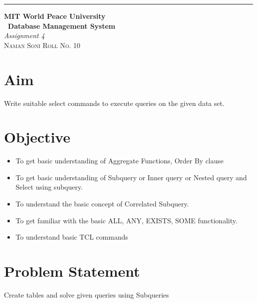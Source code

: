\documentclass{article}
\begin{document}
	\begin{titlepage} %
		
		\raggedleft\rule{1pt}{\textheight} %
		\hspace{0.05\textwidth} %
		\parbox[b]{0.75\textwidth}
		{ %
			
			{\Huge\bfseries MIT World Peace University \\[0.5\baselineskip] \ Database Management System}\\[2\baselineskip] %
			{\large\textit{Assignment 4}}\\[4\baselineskip] %
			{\Large\textsc{Naman Soni Roll No. 10}} %
			
			\vspace{0.5\textheight} %
		}
		
\end{titlepage}
\tableofcontents
\pagebreak
\section{\textbf{Aim}}
Write suitable select commands to execute queries on the given data set.
\section{\textbf{Objective}}
\begin{itemize}
    \item To get basic understanding of Aggregate Functions, Order By clause
    \item To get basic understanding of Subquery or Inner query or Nested query and Select
    using subquery.
    \item To understand the basic concept of Correlated Subquery.
    \item To get familiar with the basic ALL, ANY, EXISTS, SOME functionality.
    \item To understand basic TCL commands
\end{itemize}
\section{\textbf{Problem Statement}}
Create tables and solve given queries using Subqueries
\end{document}
